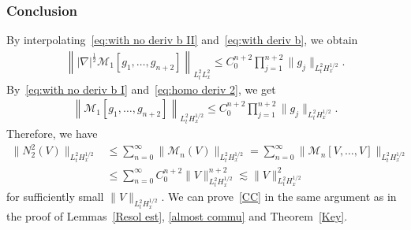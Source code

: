 \documentclass[AHL,Unicode,longabstracts,MathTools,published]{cedram}
\newcommand{\CM}{\mathcal{M}}
\newcommand{\I}{\infty}
\newcommand{\tw}{\frac{1}{2}}
\newcommand{\na}{\nabla}
\newcommand{\ls}{\lesssim}
\begin{document}
\subsubsection{Conclusion} 

By interpolating~\eqref{eq:with no deriv b II} and~\eqref{eq:with deriv b}, we obtain
\begin{align}\label{eq:homo deriv 2}
\left\||\na|^\tw \CM_1[g_1,\dots,g_{n+2}]\right\|_{L^2_t L^2_x} \le C_0^{n+2} \prod_{j=1}^{n+2} \|g_j\|_{L^2_t H^{1/2}_x}.
\end{align}
By~\eqref{eq:with no deriv b I} and~\eqref{eq:homo deriv 2}, we get
\begin{align}
\left\|\CM_1 [g_1,\dots,g_{n+2}]\right\|_{L^2_t H^{1/2}_x} \le C_0^{n+2} \prod_{j=1}^{n+2} \|g_j\|_{L^2_t H^{1/2}_x}.
\end{align}
Therefore, we have
\begin{equation}
\begin{split}
\|N_2^2(V)\|_{L^2_t H^{1/2}_x} &\le \sum_{n=0}^\I \|\CM_n(V)\|_{L^2_t H^{1/2}_x} = \sum_{n=0}^\I \|\CM_n[V,\dots,V]\|_{L^2_t H^{1/2}_x} \\
&\le \sum_{n=0}^\I C_0^{n+2} \|V\|_{L^2_t H^{1/2}_x}^{n+2}
\ls \|V\|_{L^2_t H^{1/2}_x}^2
\end{split}
\end{equation}
for sufficiently small $\|V\|_{L^2_t H^{1/2}_x}$. We can prove~\eqref{CC} in the same argument as in the proof of Lemmas~\ref{Resol est}, \ref{almost commu} and Theorem~\ref{Key}.
\end{document}
